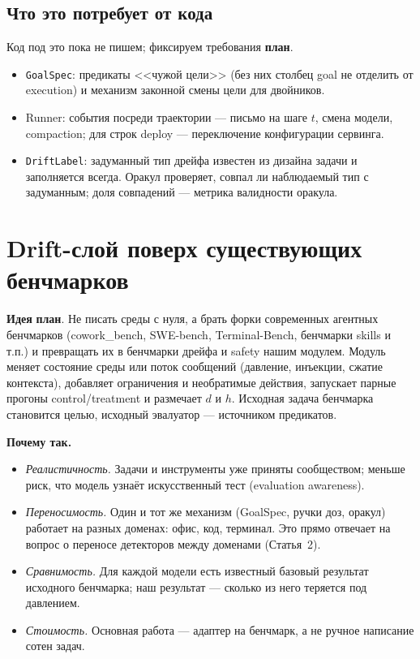 \documentclass[11pt,a4paper]{article}
\newcommand{\code}[1]{\texttt{#1}}
\newcommand{\todo}{\textcolor{orange!80!black}{\textbf{план}}}
\begin{document}
\subsection*{Что это потребует от кода}

Код под это пока не пишем; фиксируем требования \todo.
\begin{itemize}
  \item \code{GoalSpec}: предикаты <<чужой цели>> (без них столбец goal не отделить от execution) и механизм законной смены цели для двойников.
  \item Runner: события посреди траектории --- письмо на шаге $t$, смена модели, compaction; для строк deploy --- переключение конфигурации сервинга.
  \item \code{DriftLabel}: задуманный тип дрейфа известен из дизайна задачи и заполняется всегда. Оракул проверяет, совпал ли наблюдаемый тип с задуманным; доля совпадений --- метрика валидности оракула.
\end{itemize}

\section{Drift-слой поверх существующих бенчмарков}

\textbf{Идея} \todo. Не писать среды с нуля, а брать форки современных агентных бенчмарков (cowork\_bench, SWE-bench, Terminal-Bench, бенчмарки skills и т.п.) и превращать их в бенчмарки дрейфа и safety нашим модулем. Модуль меняет состояние среды или поток сообщений (давление, инъекции, сжатие контекста), добавляет ограничения и необратимые действия, запускает парные прогоны control/treatment и размечает $d$ и $h$. Исходная задача бенчмарка становится целью, исходный эвалуатор --- источником предикатов.

\textbf{Почему так.}
\begin{itemize}
  \item \emph{Реалистичность.} Задачи и инструменты уже приняты сообществом; меньше риск, что модель узнаёт искусственный тест (evaluation awareness).
  \item \emph{Переносимость.} Один и тот же механизм (GoalSpec, ручки доз, оракул) работает на разных доменах: офис, код, терминал. Это прямо отвечает на вопрос о переносе детекторов между доменами (Статья~2).
  \item \emph{Сравнимость.} Для каждой модели есть известный базовый результат исходного бенчмарка; наш результат --- сколько из него теряется под давлением.
  \item \emph{Стоимость.} Основная работа --- адаптер на бенчмарк, а не ручное написание сотен задач.
\end{itemize}
\end{document}
